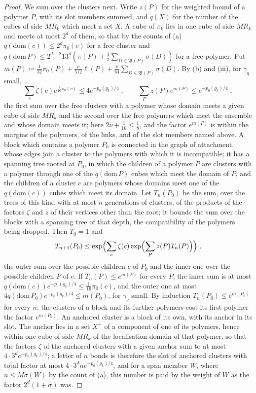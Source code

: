 \documentclass[11pt]{preprint}
\numberwithin{equation}{section}
\theoremstyle{definition}
\theoremstyle{remark}
\theoremstyle{plain}
\begin{document}
\begin{proof}
We sum over the clusters next. Write $z(P)$ for the weighted bound of a polymer $P$, with its slot members summed, and $q(X)$ for the number of the cubes of side $MR_k$ which meet a set $X$. A cube of $\pi_k$ lies in one cube of side $MR_k$ and meets at most $2^d$ of them, so that by the counts of (a) $q(\mathrm{dom}(c)) \leq 2^d\pi_0(c)$ for a free cluster and $q(\mathrm{dom}\,P) \leq 2^{d+2}13^d(\pi(P) + \frac12\sum_{D \in \mathfrak B(P)}\sigma(D))$ for a free polymer. Put $m(P) \coloneqq \frac{1}{32}\pi_0(P) + \frac{\nu}{512}\ell(P) + \frac{\nu}{64}\sum_{D \in \mathfrak B(P)}\sigma(D)$. By (b) and (iii), for $\gamma_q$ small,
\[
    \sum_{c}\zeta(c)e^{\frac{1}{16}\pi_0(c)} \leq 4e^{-p_0(g_k)/4}\;,
    \qquad
    \sum_{P}z(P)e^{m(P)} \leq e^{-p_0(g_k)/4}\;,
\]
the first sum over the free clusters with a polymer whose domain meets a given cube of side $MR_k$ and the second over the free polymers which meet the ensemble and whose domain meets it; here $2\nu + \frac{1}{16} \leq \frac18$, and the factor $e^{m(P)}$ is within the margins of the polymers, of the links, and of the slot members named above. A block which contains a polymer $P_0$ is connected in the graph of attachment, whose edges join a cluster to the polymers with which it is incompatible; it has a spanning tree rooted at $P_0$, in which the children of a polymer $P$ are clusters with a polymer through one of the $q(\mathrm{dom}\,P)$ cubes which meet the domain of $P$, and the children of a cluster $c$ are polymers whose domains meet one of the $q(\mathrm{dom}(c))$ cubes which meet its domain. Let $T_n(P_0)$ be the sum, over the trees of this kind with at most $n$ generations of clusters, of the products of the factors $\zeta$ and $z$ of their vertices other than the root; it bounds the sum over the blocks with a spanning tree of that depth, the compatibility of the polymers being dropped. Then $T_0 = 1$ and
\[
    T_{n+1}(P_0) \leq \exp\Bigl(\sum_{c}\zeta(c)\exp\Bigl(\sum_{P}z(P)T_n(P)\Bigr)\Bigr)\;,
\]
the outer sum over the possible children $c$ of $P_0$ and the inner one over the possible children $P$ of $c$. If $T_n(P) \leq e^{m(P)}$ for every $P$, the inner sum is at most $q(\mathrm{dom}(c))e^{-p_0(g_k)/4} \leq \frac{1}{16}\pi_0(c)$, and the outer one at most $4q(\mathrm{dom}\,P_0)e^{-p_0(g_k)/4} \leq m(P_0)$, for $\gamma_q$ small. By induction $T_n(P_0) \leq e^{m(P_0)}$ for every $n$: the clusters of a block and its further polymers cost its first polymer the factor $e^{m(P_0)}$. An anchored cluster is a block of its own, with its anchor in its slot. The anchor lies in a set $X^+$ of a component of one of its polymers, hence within one cube of side $MR_k$ of the localisation domain of that polymer, so that the factors $\zeta$ of the anchored clusters with a given anchor sum to at most $4 \cdot 3^de^{-p_0(g_k)/4}$; a letter of $n$ bonds is therefore the slot of anchored clusters with total factor at most $4 \cdot 3^dne^{-p_0(g_k)/4}$, and for a span member $W$, where $n \leq M\sigma(W)$ by the count of (a), this number is paid by the weight of $W$ as the factor $2^d(1 + \sigma)$ was.


\end{proof}
\end{document}
